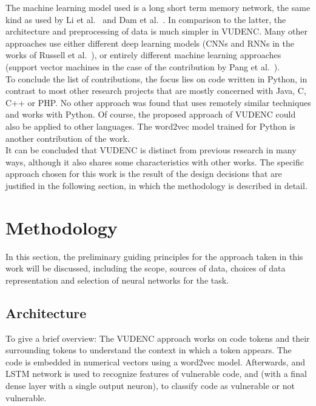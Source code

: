 \documentclass[
a4paper,
pagesize,
pdftex,
12pt,
twoside, %
BCOR=5mm, %
ngerman,
fleqn,
final,
]{scrartcl}
\begin{document}
	The machine learning model used is a long short term memory network, the same kind as used by Li et al.~\cite{Li.2018} and Dam et al.~\cite{Dam.2017}. In comparison to the latter, the architecture and preprocessing of data is much simpler in VUDENC. Many other approaches use either different deep learning models (CNNs and RNNs in the works of Russell et al.~\cite{Russell.2018}), or entirely different machine learning approaches (support vector machines in the case of the contribution by Pang et al.~\cite{Pang.2015}).\\
	To conclude the list of contributions, the focus lies on code written in Python, in contrast to most other research projects that are mostly concerned with Java, C, C++ or PHP. No other approach was found that uses remotely similar techniques and works with Python. Of course, the proposed approach of VUDENC could also be applied to other languages. The word2vec model trained for Python is another contribution of the work.\\
	It can be concluded that VUDENC is distinct from previous research in many ways, although it also shares some characteristics with other works. The specific approach chosen for this work is the result of the design decisions that are justified in the following section, in which the methodology is described in detail.
	
	
	\newpage
	\section{Methodology}\label{Methodology}
	In this section, the  preliminary guiding principles for the approach taken in this work will be discussed, including the scope, sources of data, choices of data representation and selection of neural networks for the task. 
	
	\subsection{Architecture}
	To give a brief overview: The VUDENC approach works on code tokens and their surrounding tokens to understand the context in which a token appears. The code is embedded in numerical vectors using a word2vec model. Afterwards, and LSTM network is used to recognize features of vulnerable code, and (with a final dense layer with a single output neuron), to classify code as vulnerable or not vulnerable.  
	
\end{document}
